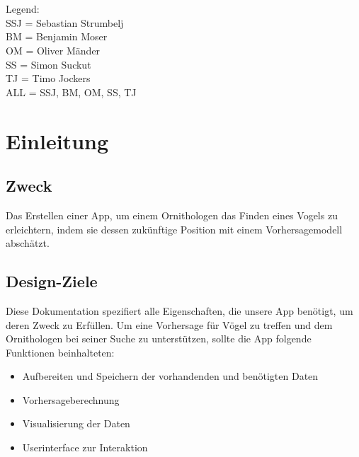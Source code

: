 \documentclass[12pt]{article} %
\begin{document}
{\small

\noindent
\\\\Legend: \\
SSJ = Sebastian Strumbelj \\
BM = Benjamin Moser \\
OM = Oliver Mänder \\
SS = Simon Suckut \\
TJ = Timo Jockers \\
ALL = SSJ, BM, OM, SS, TJ \\
}



\section{Einleitung} %


\subsection{Zweck}
Das Erstellen einer App, um einem Ornithologen das Finden eines Vogels zu erleichtern, indem sie dessen zukünftige Position mit einem Vorhersagemodell abschätzt. 


\subsection{Design-Ziele}

Diese Dokumentation spezifiert alle Eigenschaften, die unsere App benötigt, um deren Zweck zu Erfüllen. Um eine Vorhersage für Vögel zu treffen und dem Ornithologen bei seiner Suche zu unterstützen, sollte die App folgende Funktionen beinhalteten: 
\begin{itemize}
	\item Aufbereiten und Speichern der vorhandenden und benötigten Daten
	\item Vorhersageberechnung 
	\item Visualisierung der Daten
	\item Userinterface zur Interaktion 
\end{itemize}



\end{document}
